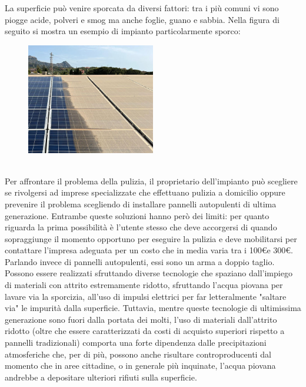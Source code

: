 \documentclass[a4paper, 12pt]{article}
\begin{document}
	La superficie può venire sporcata da diversi fattori: tra i più comuni vi sono piogge acide, polveri e smog ma anche foglie, guano e sabbia. Nella figura di seguito si mostra un esempio di impianto particolarmente sporco:
	\begin{figure}[h]
		\centering\includegraphics[width=0.5\textwidth]{Images/pannelli_sporchi2.jpg}
	\end{figure}\\
	Per affrontare il problema della pulizia, il proprietario dell'impianto può scegliere se rivolgersi ad imprese specializzate che effettuano pulizia a domicilio oppure prevenire il problema scegliendo di installare pannelli autopulenti di ultima generazione. Entrambe queste soluzioni hanno però dei limiti: per quanto riguarda la prima possibilità è l'utente stesso che deve accorgersi di quando sopraggiunge il momento opportuno per eseguire la pulizia e deve mobilitarsi per contattare l'impresa adeguata per un costo che in media varia tra i 100\euro e 300\euro.\\
	Parlando invece di pannelli autopulenti, essi sono un arma a doppio taglio. Possono essere realizzati sfruttando diverse tecnologie che spaziano dall'impiego di materiali con attrito estremamente ridotto, sfruttando l'acqua piovana per lavare via la sporcizia, all'uso di impulsi elettrici per far letteralmente "saltare via" le impurità dalla superficie. Tuttavia, mentre queste tecnologie di ultimissima generazione sono fuori dalla portata dei molti, l'uso di materiali dall'attrito ridotto (oltre che essere caratterizzati da costi di acquisto superiori rispetto  a pannelli tradizionali) comporta una forte dipendenza dalle precipitazioni atmosferiche che, per di più, possono anche risultare controproducenti dal momento che in aree cittadine, o in generale più inquinate, l'acqua piovana andrebbe a depositare ulteriori rifiuti sulla superficie.\\
\end{document}
